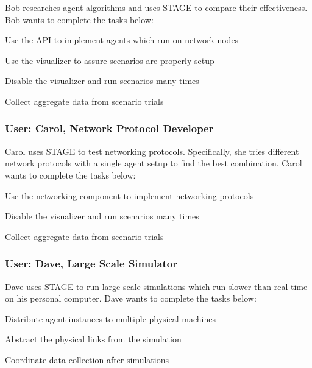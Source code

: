 \documentclass[titlepage]{article}
\begin{document}
Bob researches agent algorithms and uses STAGE to compare their effectiveness.  Bob wants to complete the tasks below:

\begin{itemize*}
    \item Use the API to implement agents which run on network nodes
    \item Use the visualizer to assure scenarios are properly setup
    \item Disable the visualizer and run scenarios many times
    \item Collect aggregate data from scenario trials
\end{itemize*}

\subsubsection{User: Carol, Network Protocol Developer%
  \label{bob}%
}

Carol uses STAGE to test networking protocols.  Specifically, she tries different network protocols with a single agent
setup to find the best combination.  Carol wants to complete the tasks below:

\begin{itemize*}
    \item Use the networking component to implement networking protocols
    \item Disable the visualizer and run scenarios many times
    \item Collect aggregate data from scenario trials
\end{itemize*}

\subsubsection{User: Dave, Large Scale Simulator%
  \label{bob}%
}

Dave uses STAGE to run large scale simulations which run slower than real-time on his personal computer.  Dave wants to
complete the tasks below:

\begin{itemize*}
    \item Distribute agent instances to multiple physical machines
    \item Abstract the physical links from the simulation
    \item Coordinate data collection after simulations
\end{itemize*}
\end{document}
